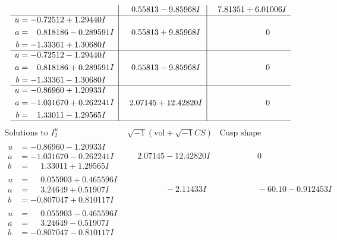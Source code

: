 \documentclass[1p]{elsarticle_modified}
\theoremstyle{definition}
\newcommand{\I}{\sqrt{-1}}
\begin{document}
$$\begin{array}{c|c|c}
 & \phantom{-}0.55813 - 9.85968 I & \phantom{-}7.81351 + 6.01006 I \\ \hline\begin{aligned}
u &= -0.72512 + 1.29440 I \\
a &= \phantom{-}0.818186 - 0.289591 I \\
b &= -1.33361 + 1.30680 I\end{aligned}
 & \phantom{-}0.55813 + 9.85968 I & \phantom{-0.000000 } 0 \\ \hline\begin{aligned}
u &= -0.72512 - 1.29440 I \\
a &= \phantom{-}0.818186 + 0.289591 I \\
b &= -1.33361 - 1.30680 I\end{aligned}
 & \phantom{-}0.55813 - 9.85968 I & \phantom{-0.000000 } 0 \\ \hline\begin{aligned}
u &= -0.86960 + 1.20933 I \\
a &= -1.031670 + 0.262241 I \\
b &= \phantom{-}1.33011 - 1.29565 I\end{aligned}
 & \phantom{-}2.07145 + 12.42820 I & \phantom{-0.000000 } 0\\
 \hline 
 \end{array}$$\newpage$$\begin{array}{c|c|c}  
\text{Solutions to }I^u_{2}& \I (\text{vol} + \sqrt{-1}CS) & \text{Cusp shape}\\
 \hline 
\begin{aligned}
u &= -0.86960 - 1.20933 I \\
a &= -1.031670 - 0.262241 I \\
b &= \phantom{-}1.33011 + 1.29565 I\end{aligned}
 & \phantom{-}2.07145 - 12.42820 I & \phantom{-0.000000 } 0 \\ \hline\begin{aligned}
u &= \phantom{-}0.055903 + 0.465596 I \\
a &= \phantom{-}3.24649 + 0.51907 I \\
b &= -0.807047 + 0.810117 I\end{aligned}
 & \phantom{-0.000000 } -2.11433 I & \phantom{-0.000000 }      -6
0. 10   - 0.912453 I \\ \hline\begin{aligned}
u &= \phantom{-}0.055903 - 0.465596 I \\
a &= \phantom{-}3.24649 - 0.51907 I \\
b &= -0.807047 - 0.810117 I\end{aligned}

\end{array}$$
\end{document}
